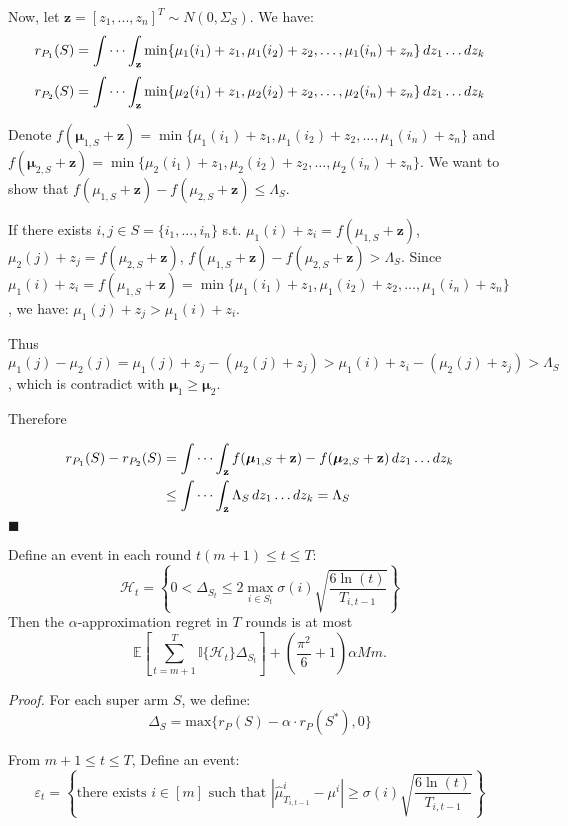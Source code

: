 \documentclass[opre,sglanonrev]{informs4}
\begin{document}
Now, let $\mathbf{z} = [z_1,...,z_n]^T \sim N(0,\Sigma_S)$. We have:
$$
r_{P_1}(S) = \idotsint_\mathbf{z} \min \{\mu_1(i_1)+z_1,\mu_1(i_2)+z_2, \dots ,\mu_1(i_n)+z_n\} \,dz_1 \dots dz_k
$$
$$
r_{P_2}(S) = \idotsint_\mathbf{z} \min \{\mu_2(i_1)+z_1,\mu_2(i_2)+z_2, \dots ,\mu_2(i_n)+z_n\} \,dz_1 \dots dz_k
$$

Denote $f(\boldsymbol{\mu}_{1,S}+\mathbf{z}) = \min \{\mu_1(i_1)+z_1,\mu_1(i_2)+z_2, \dots ,\mu_1(i_n)+z_n\}$ and $f(\boldsymbol{\mu}_{2,S}+\mathbf{z}) = \min \{\mu_2(i_1)+z_1,\mu_2(i_2)+z_2, \dots ,\mu_2(i_n)+z_n\}$. We want to show that $f(\mu_{1,S}+\mathbf{z})-f(\mu_{2,S}+\mathbf{z})\leq \Lambda_S$.

If there exists $i,j\in S=\{i_1,...,i_n\}$ s.t. $\mu_1(i)+z_i = f(\mu_{1,S}+\mathbf{z})$, $\mu_2(j)+z_j = f(\mu_{2,S}+\mathbf{z})$, $f(\mu_{1,S}+\mathbf{z})-f(\mu_{2,S}+\mathbf{z})>\Lambda_S$. Since $\mu_1(i)+z_i = f(\mu_{1,S}+\mathbf{z}) = \min \{\mu_1(i_1)+z_1,\mu_1(i_2)+z_2, \dots ,\mu_1(i_n)+z_n\}$, we have: $\mu_1(j)+z_j> \mu_1(i)+z_i$.

Thus $\mu_1(j)-\mu_2(j) = \mu_1(j)+z_j-(\mu_2(j)+z_j)>\mu_1(i)+z_i-(\mu_2(j)+z_j)>\Lambda_S$, which is contradict with $\boldsymbol{\mu}_1 \geq \boldsymbol{\mu}_2$.

Therefore

$$
\begin{aligned}
r_{P_1}(S)-r_{P_2}(S) &= \idotsint_\mathbf{z} f(\boldsymbol{\mu}_{1,S}+\mathbf{z})-f(\boldsymbol{\mu}_{2,S}+\mathbf{z}) \,dz_1 \dots dz_k\\
&\leq \idotsint_\mathbf{z} \Lambda_S \,dz_1 \dots dz_k = \Lambda_S 
\end{aligned}
$$
\hfill $\blacksquare$

\begin{lemma}
Define an event in each round $t(m+1)\leq t \leq T$:
$$
	\mathcal{H}_t = \left\{0<\Delta_{S_t}\leq 2\mathop{\max}\limits_{i\in S_t}\sigma(i)\sqrt{\frac{6\ln(t)}{T_{i,t-1}}}\right\}
$$
Then the $\alpha$-approximation regret in $T$ rounds is at most
$$
	\mathbb{E}[\sum_{t=m+1}^{T}\mathbb{I}\{\mathcal{H}_t\}\Delta_{S_t}] + (\frac{\pi^2}{6}+1)\alpha M m.
$$
\end{lemma}
\textit{Proof.} For each super arm $S$, we define:
$$
\Delta_S = \text{max}\{r_P(S) - \alpha \cdot r_P(S^*), 0 \}
$$

From $m+1\leq t \leq T$, Define an event:
$$
\varepsilon_t = \left\{\text{there exists } i \in [m] \text{ such that } |\hat{\mu}_{T_{i,t-1}}^i-\mu^i| \geq \sigma(i)\sqrt{\frac{6\ln(t)}{T_{i,t-1}}}\right\}
$$
\end{document}
